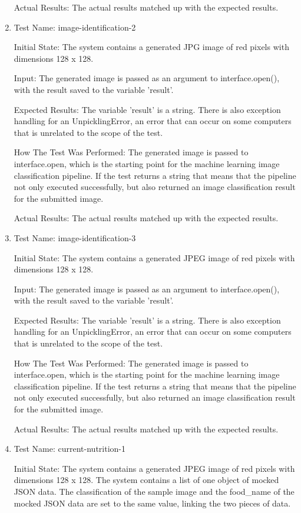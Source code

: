 \documentclass[12pt, titlepage]{article}
\begin{document}
\begin{enumerate}
		Actual Results: The actual results matched up with the expected results.
        \item{Test Name: image-identification-2}
		
		Initial State: The system contains a generated JPG image of red pixels with dimensions 128 x 128.
		
		Input: The generated image is passed as an argument to interface.open(), with the result saved to the variable 'result'.
		
		Expected Results: The variable 'result' is a string. There is also exception handling for an UnpicklingError, an error that can occur on some computers that is unrelated to the scope of the test.
		
		How The Test Was Performed: The generated image is passed to interface.open, which is the starting point for the machine learning image classification pipeline. If the test returns a string that means that the pipeline not only executed successfully, but also returned an image classification result for the submitted image.
		
		Actual Results: The actual results matched up with the expected results.
        \item{Test Name: image-identification-3}
		
		Initial State: The system contains a generated JPEG image of red pixels with dimensions 128 x 128.
		
		Input: The generated image is passed as an argument to interface.open(), with the result saved to the variable 'result'.
		
		Expected Results: The variable 'result' is a string. There is also exception handling for an UnpicklingError, an error that can occur on some computers that is unrelated to the scope of the test.
		
		How The Test Was Performed: The generated image is passed to interface.open, which is the starting point for the machine learning image classification pipeline. If the test returns a string that means that the pipeline not only executed successfully, but also returned an image classification result for the submitted image.
		
		Actual Results: The actual results matched up with the expected results.
        \item{Test Name: current-nutrition-1}
		
		Initial State: The system contains a generated JPEG image of red pixels with dimensions 128 x 128. The system contains a list of one object of mocked JSON data. The classification of the sample image and the food\_name of the mocked JSON data are set to the same value, linking the two pieces of data.
		

\end{enumerate}
\end{document}

